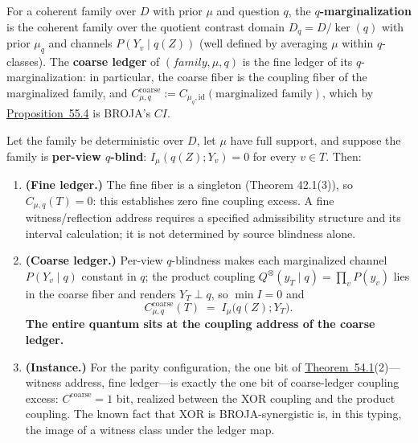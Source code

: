 \begin{thmdef}

For a coherent family over \(D\) with prior \(\mu\) and question \(q\), the \textbf{\(q\)-marginalization} is the coherent family over the quotient contrast domain \(D_q = D/\ker(q)\) with prior \(\mu_q\) and channels \(P(Y_v \mid q(Z))\) (well defined by averaging \(\mu\) within \(q\)-classes). The \textbf{coarse ledger} of \((family, \mu, q)\) is the fine ledger of its \(q\)-marginalization: in particular, the coarse fiber is the coupling fiber of the marginalized family, and \(C^{\mathrm{coarse}}_{\mu,q} := C_{\mu_q, \mathrm{id}}(\text{marginalized family})\), which by \hyperlink{stmt:55.4}{Proposition~55.4} is BROJA's \(CI\).
\end{thmdef}

\begin{thmplain}

Let the family be deterministic over \(D\), let \(\mu\) have full support, and suppose the family is \textbf{per-view \(q\)-blind}: \(I_\mu(q(Z); Y_v) = 0\) for every \(v \in T\). Then:

\begin{enumerate}
\def\labelenumi{\arabic{enumi}.}
\item
  \textbf{(Fine ledger.)} The fine fiber is a singleton (Theorem 42.1(3)), so \(C_{\mu,q}(T) = 0\): this establishes zero fine coupling excess. A fine witness/reflection address requires a specified admissibility structure and its interval calculation; it is not determined by source blindness alone.
\item
  \textbf{(Coarse ledger.)} Per-view \(q\)-blindness makes each marginalized channel \(P(Y_v \mid q)\) constant in \(q\); the product coupling \(Q^\otimes(y_T \mid q) = \prod_v P(y_v)\) lies in the coarse fiber and renders \(Y_T \perp q\), so \(\min I = 0\) and
  \[
  C^{\mathrm{coarse}}_{\mu,q}(T) \;=\; I_\mu\big(q(Z); Y_T\big).
  \]
  \textbf{The entire quantum sits at the coupling address of the coarse ledger.}
\item
  \textbf{(Instance.)} For the parity configuration, the one bit of \hyperlink{stmt:54.1}{Theorem~54.1}(2)---\hspace{0pt}witness address, fine ledger---\hspace{0pt}is exactly the one bit of coarse-ledger coupling excess: \(C^{\mathrm{coarse}} = 1\) bit, realized between the XOR coupling and the product coupling. The known fact that XOR is BROJA-synergistic is, in this typing, the image of a witness class under the ledger map.
\end{enumerate}
\end{thmplain}

